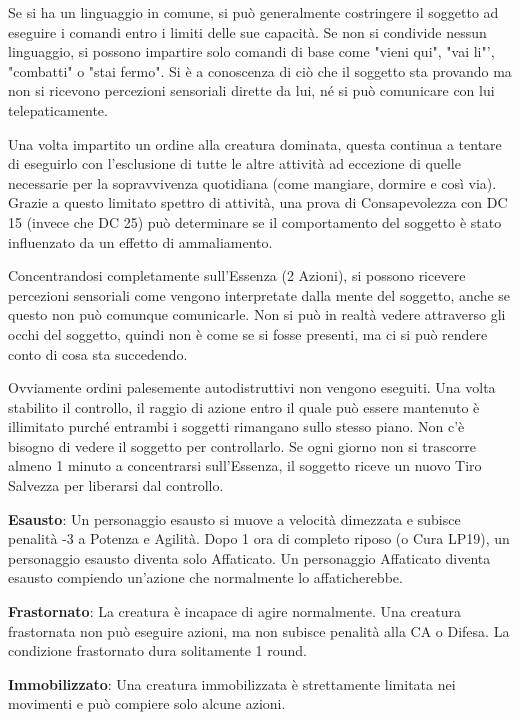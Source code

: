 \documentclass[a4paper,11pt,twoside,openany]{book}
\begin{document}
Se si ha un linguaggio in comune, si può generalmente costringere il soggetto ad eseguire i comandi entro i limiti delle sue capacità. Se non si condivide nessun linguaggio, si possono impartire solo comandi di base come "vieni qui", "vai li"', "combatti" o "stai fermo". Si è a conoscenza di ciò che il soggetto sta provando ma non si ricevono percezioni sensoriali dirette da lui, né si può comunicare con lui telepaticamente.

Una volta impartito un ordine alla creatura dominata, questa continua a tentare di eseguirlo con l'esclusione di tutte le altre attività ad eccezione di quelle necessarie per la sopravvivenza quotidiana (come mangiare, dormire e così via). Grazie a questo limitato spettro di attività, una prova di Consapevolezza con DC 15 (invece che DC 25) può determinare se il comportamento del soggetto è stato influenzato da un effetto di ammaliamento.

Concentrandosi completamente sull'Essenza (2 Azioni), si possono ricevere percezioni sensoriali come vengono interpretate dalla mente del soggetto, anche se questo non può comunque comunicarle. Non si può in realtà vedere attraverso gli occhi del soggetto, quindi non è come se si fosse presenti, ma ci si può rendere conto di cosa sta succedendo.

Ovviamente ordini palesemente autodistruttivi non vengono eseguiti. Una volta stabilito il controllo, il raggio di azione entro il quale può essere mantenuto è illimitato purché entrambi i soggetti rimangano sullo stesso piano. Non c'è bisogno di vedere il soggetto per controllarlo. Se ogni giorno non si trascorre almeno 1 minuto a concentrarsi sull'Essenza, il soggetto riceve un nuovo Tiro Salvezza per liberarsi dal controllo.

\textbf{Esausto}: Un personaggio esausto si muove a velocità dimezzata e subisce penalità -3 a Potenza e Agilità. Dopo 1 ora di completo riposo (o Cura LP19), un personaggio esausto diventa solo Affaticato. Un personaggio Affaticato diventa esausto compiendo un'azione che normalmente lo affaticherebbe.

\textbf{Frastornato}: La creatura è incapace di agire normalmente.
Una creatura frastornata non può eseguire azioni, ma non subisce penalità alla CA o Difesa. La condizione frastornato dura solitamente 1 round.

\textbf{Immobilizzato}: Una creatura immobilizzata è strettamente limitata nei movimenti e può compiere solo alcune azioni.
\end{document}
